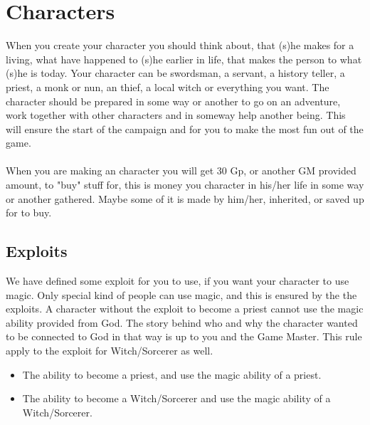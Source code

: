 \chapter{Characters}
When you create your character you should think about, that (s)he makes for a living, what have happened to (s)he earlier in life, that makes the person to what (s)he is today.
Your character can be swordsman, a servant, a history teller, a priest, a monk or nun, an thief, a local witch or everything you want.
The character should be prepared in some way or another to go on an adventure, work together with other characters and in someway help another being.
This will ensure the start of the campaign and for you to make the most fun out of the game.
\\\\
When you are making an character you will get 30 Gp, or another GM provided amount, to "buy" stuff for, this is money you character in his/her life in some way or another gathered.
Maybe some of it is made by him/her, inherited, or saved up for to buy.

\section{Exploits}
We have defined some exploit for you to use, if you want your character to use magic.
Only special kind of people can use magic, and this is ensured by the the exploits.
A character without the exploit to become a priest cannot use the magic ability provided from God.
The story behind who and why the character wanted to be connected to God in that way is up to you and the Game Master.
This rule apply to the exploit for Witch/Sorcerer as well.

\begin{itemize}
    \item The ability to become a priest, and use the magic ability of a priest.
    \item The ability to become a Witch/Sorcerer and use the magic ability of a Witch/Sorcerer.
\end{itemize}
